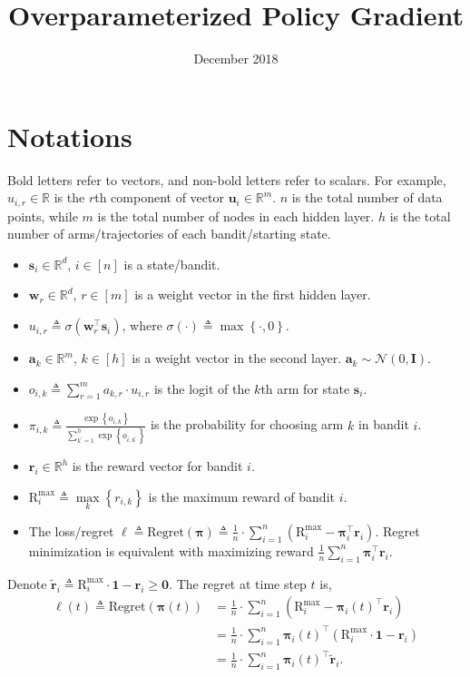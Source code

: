 \documentclass[10pt]{article}
\title{Overparameterized Policy Gradient}
\author{}
\date{December 2018}
\def\rva{{\mathbf{a}}}
\def\rvr{{\mathbf{r}}}
\def\rvs{{\mathbf{s}}}
\def\rvu{{\mathbf{u}}}
\def\rvw{{\mathbf{w}}}
\def\rvone{{\mathbf{1}}}
\def\rvzero{{\mathbf{0}}}
\def\rvtilder{{\tilde{\mathbf{r}}}}
\def\r{{\text{R}}}
\def\regret{{\text{Regret}}}
\def\rvpi{{\boldsymbol{\pi}}}
\def\rmI{{\mathbf{I}}}
\def\sR{{\mathbb{R}}}
\def\gN{{\mathcal{N}}}
\begin{document}
\maketitle

\section{Notations}

Bold letters refer to vectors, and non-bold letters refer to scalars. For example, $u_{i,r} \in \sR$ is the $r$th component of vector $\rvu_i \in \sR^m$. $n$ is the total number of data points, while $m$ is the total number of nodes in each hidden layer. $h$ is the total number of arms/trajectories of each bandit/starting state.

\begin{itemize}
	\item $\rvs_i \in \sR^d$, $i \in [n]$ is a state/bandit.
	\item $\rvw_r \in \sR^d$, $r \in [m]$ is a weight vector in the first hidden layer.
	\item $u_{i,r} \triangleq \sigma(\rvw_r^\top \rvs_i)$, where $\sigma(\cdot) \triangleq \max\left\{ \cdot, 0 \right\}$.
	\item $\rva_k \in \sR^m$, $k \in [h]$ is a weight vector in the second layer. $\rva_k \sim \gN(0, \rmI)$.
	\item $o_{i,k} \triangleq \sum\limits_{r=1}^{m}{a_{k,r} \cdot u_{i,r}}$ is the logit of the $k$th arm for state $\rvs_i$.
	\item $\pi_{i,k} \triangleq \frac{\exp\left\{ o_{i,k} \right\}}{\sum\limits_{k^\prime = 1}^{h}{\exp\left\{ o_{i,k^\prime} \right\}}}$ is the  probability for choosing arm $k$ in bandit $i$.
	\item $\rvr_i \in \sR^h$ is the reward vector for bandit $i$.
	\item $\r_i^{\max} \triangleq \max\limits_{k}\left\{ r_{i,k} \right\}$ is the maximum reward of bandit $i$.
	\item The loss/regret $\ell \triangleq \regret(\rvpi) \triangleq \frac{1}{n} \cdot \sum\limits_{i=1}^{n}{ \left( \r_i^{\max} - \rvpi_i^\top \rvr_i \right) }$. Regret minimization is equivalent with maximizing reward $\frac{1}{n} \sum\limits_{i=1}^{n}{\rvpi_i^\top \rvr_i}$.
\end{itemize}

Denote $\rvtilder_{i} \triangleq \r_i^{\max} \cdot \rvone -  \rvr_{i} \ge \rvzero$. The regret at time step $t$ is,
\begin{equation*}
\begin{split}
	\ell(t) \triangleq \regret(\rvpi(t)) &= \frac{1}{n} \cdot \sum\limits_{i=1}^{n}{ \left( \r_i^{\max} - \rvpi_{i}(t)^\top \rvr_i \right) } \\
	&= \frac{1}{n} \cdot \sum\limits_{i=1}^{n}{ \rvpi_{i}(t)^\top \left( \r_i^{\max} \cdot \rvone - \rvr_{i} \right) } \\
	&= \frac{1}{n} \cdot \sum\limits_{i=1}^{n}{ \rvpi_{i}(t)^\top \rvtilder_{i} }.
\end{split}
\end{equation*}
\end{document}
